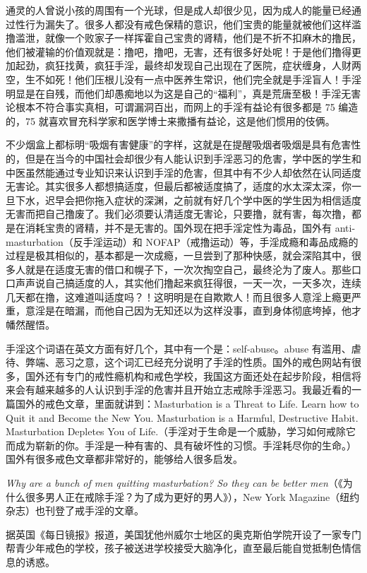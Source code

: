 通灵的人曾说小孩的周围有一个光球，但是成人却很少见，因为成人的能量已经通过性行为漏失了。很多人都没有戒色保精的意识，他们宝贵的能量就被他们这样滥撸滥泄，就像一个败家子一样挥霍自己宝贵的肾精，他们是不折不扣麻木的撸民，他们被灌输的价值观就是：撸吧，撸吧，无害，还有很多好处呢！于是他们撸得更加起劲，疯狂找黄，疯狂手淫，最终却发现自己出现在了医院，症状缠身，人财两空，生不如死！他们压根儿没有一点中医养生常识，他们完全就是手淫盲人！手淫明显是在自残，而他们却愚痴地以为这是自己的“福利”，真是荒唐至极！手淫无害论根本不符合事实真相，可谓漏洞百出，而网上的手淫有益论有很多都是 75 编造的，75 就喜欢冒充科学家和医学博士来撒播有益论，这是他们惯用的伎俩。

不少烟盒上都标明“吸烟有害健康”的字样，这就是在提醒吸烟者吸烟是具有危害性的，但是在当今的中国社会却很少有人能认识到手淫恶习的危害，学中医的学生和中医虽然能通过专业知识来认识到手淫的危害，但其中有不少人却依然在认同适度无害论。其实很多人都想搞适度，但最后都被适度搞了，适度的水太深太深，你一旦下水，迟早会把你拖入症状的深渊，之前就有好几个学中医的学生因为相信适度无害而把自己撸废了。我们必须要认清适度无害论，只要撸，就有害，每次撸，都是在消耗宝贵的肾精，并不是无害的。国外现在把手淫定性为毒品，国外有 anti-masturbation（反手淫运动）和 NOFAP（戒撸运动）等，手淫成瘾和毒品成瘾的过程是极其相似的，基本都是一次成瘾，一旦尝到了那种快感，就会深陷其中，很多人就是在适度无害的借口和幌子下，一次次掏空自己，最终沦为了废人。那些口口声声说自己搞适度的人，其实他们撸起来疯狂得很，一天一次，一天多次，连续几天都在撸，这难道叫适度吗？！这明明是在自欺欺人！而且很多人意淫上瘾更严重，意淫是在暗漏，而他自己因为无知还以为这样没事，直到身体彻底垮掉，他才幡然醒悟。

手淫这个词语在英文方面有好几个，其中有一个是：self-abuse。abuse 有滥用、虐待、弊端、恶习之意，这个词汇已经充分说明了手淫的性质。国外的戒色网站有很多，国外还有专门的戒性瘾机构和戒色学校，我国这方面还处在起步阶段，相信将来会有越来越多的人认识到手淫的危害并且开始立志戒除手淫恶习。我最近看的一篇国外的戒色文章，里面就讲到：Masturbation is a Threat to Life. Learn how to Quit it and Become the New You. Masturbation is a Harmful, Destructive Habit. Masturbation Depletes You of Life.（手淫对于生命是一个威胁，学习如何戒除它而成为崭新的你。手淫是一种有害的、具有破坏性的习惯。手淫耗尽你的生命。）国外有很多戒色文章都非常好的，能够给人很多启发。

\textit{Why are a bunch of men quitting masturbation? So they can be better men}（《为什么很多男人正在戒除手淫？为了成为更好的男人》），New York Magazine（纽约杂志）也刊登了戒手淫的文章。

据英国《每日镜报》报道，美国犹他州威尔士地区的奥克斯伯学院开设了一家专门帮青少年戒色的学校，孩子被送进学校接受大脑净化，直至最后能自觉抵制色情信息的诱惑。

